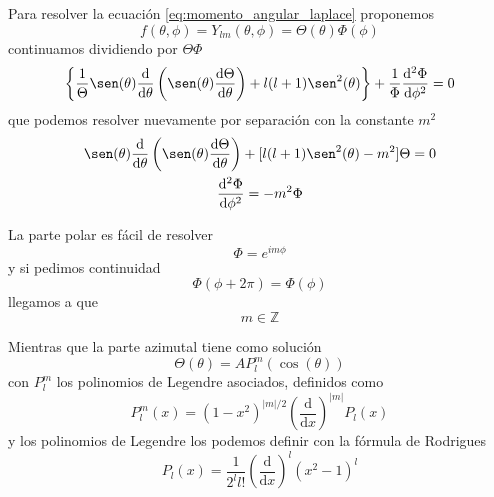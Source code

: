 \documentclass{book}
\numberwithin{equation}{section} %
\begin{document}
Para resolver la ecuación \ref{eq:momento_angular_laplace} proponemos
\begin{equation}
    f(\theta, \phi) = Y_{l m}(\theta, \phi) = \Theta(\theta) \Phi(\phi)
\end{equation}
continuamos dividiendo por $\Theta \Phi$
\begin{equation}
    \left\{ \frac{1}{\Theta} \sen(\theta) \frac{\mathrm{d}}{\mathrm{d}\theta} \left(\sen(\theta) \frac{\mathrm{d}\Theta}{\mathrm{d}\theta}\right) + l (l + 1) \sen^2(\theta) \right\} + \frac{1}{\Phi} \frac{\mathrm{d}^2 \Phi}{\mathrm{d}\phi^2} = 0
\end{equation}
que podemos resolver nuevamente por separación con la constante $m^2$
\begin{equation}
    \begin{gathered}
    \sen(\theta) \frac{\mathrm{d}}{\mathrm{d}\theta} \left(\sen(\theta) \frac{\mathrm{d}\Theta}{\mathrm{d}\theta}\right) + [l (l + 1) \sen^2(\theta) - m^2] \Theta = 0 \\ 
    \frac{\mathrm{d}^2 \Phi}{\mathrm{d}\phi^2} = - m^2 \Phi
\end{gathered}
\end{equation}

La parte polar es fácil de resolver
\begin{equation}
    \Phi = e^{i m \phi}
\end{equation}
y si pedimos continuidad 
\begin{equation}
    \Phi(\phi + 2\pi) = \Phi(\phi)
\end{equation}
llegamos a que 
\begin{equation}
    m \in \mathbb{Z}
\end{equation}

Mientras que la parte azimutal tiene como solución 
\begin{equation}
    \Theta(\theta) = A P^{m}_l(\cos(\theta))
\end{equation}
con $P^{m}_l$ los polinomios de Legendre asociados, definidos como
\begin{equation}
    P^{m}_l(x) = (1 - x^2)^{|m|/2} \left(\frac{\mathrm{d}}{\mathrm{d}x}\right)^{|m|} P_l(x)
    \end{equation}
y los polinomios de Legendre los podemos definir con la fórmula de Rodrigues
\begin{equation}
    P_l(x) = \frac{1}{2^l l!} \left(\frac{\mathrm{d}}{\mathrm{d}x}\right)^{l} (x^2 - 1)^l
\end{equation}
\end{document}
